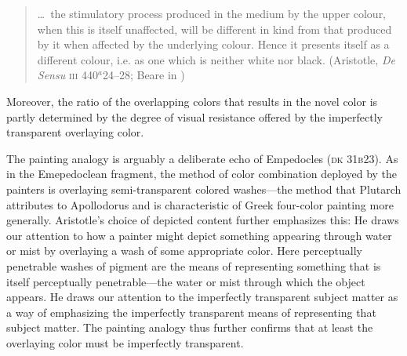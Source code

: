 \begin{quote}
	\ldots\ the stimulatory process produced in the medium by the upper colour, when this is itself unaffected, will be different in kind from that produced by it when affected by the underlying colour. Hence it presents itself as a different colour, i.e. as one which is neither white nor black. (Aristotle, \emph{De Sensu} \textsc{iii} 440\( ^{a} \)24--28; Beare in \citealt[9]{Barnes:1984uq})
\end{quote}
Moreover, the ratio of the overlapping colors that results in the novel color is partly determined by the degree of visual resistance offered by the imperfectly transparent overlaying color.

The painting analogy is arguably a deliberate echo of Empedocles (\textsc{dk} 31\textsc{b}23). As in the Emepedoclean fragment, the method of color combination deployed by the painters is overlaying semi-transparent colored washes---the method that Plutarch attributes to Apollodorus and is characteristic of Greek four-color painting more generally. Aristotle's choice of depicted content further emphasizes this: He draws our attention to how a painter might depict something appearing through water or mist by overlaying a wash of some appropriate color. Here perceptually penetrable washes of pigment are the means of representing something that is itself perceptually penetrable---the water or mist through which the object appears. He draws our attention to the imperfectly transparent subject matter as a way of emphasizing the imperfectly transparent means of representing that subject matter. The painting analogy thus further confirms that at least the overlaying color must be imperfectly transparent.

